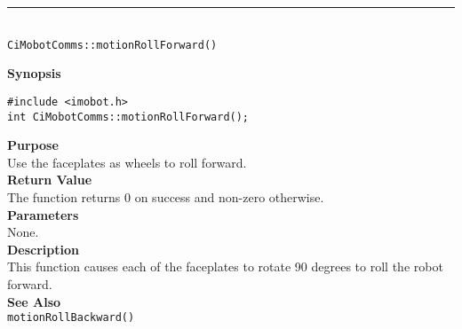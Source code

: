 \noindent
\vspace{5pt}
\rule{4.5in}{0.015in}\\
\noindent
{\LARGE \texttt{CiMobotComms::motionRollForward()}}\\
{}

\noindent
{\bf Synopsis}\\
\begin{verbatim}
#include <imobot.h>
int CiMobotComms::motionRollForward();
\end{verbatim}

\noindent
{\bf Purpose}\\
Use the faceplates as wheels to roll forward.\\

\noindent
{\bf Return Value}\\
The function returns 0 on success and non-zero otherwise.\\

\noindent
{\bf Parameters}\\
None.\\

\noindent
{\bf Description}\\
This function causes each of the faceplates to rotate 90 degrees to roll the
robot forward.\\

\noindent
{\bf See Also}\\
\texttt{motionRollBackward()}

